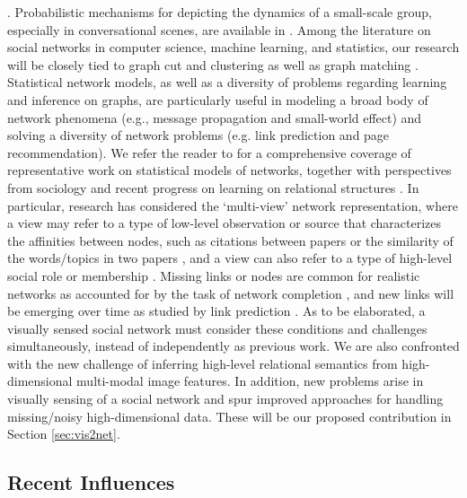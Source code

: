 . Probabilistic mechanisms for depicting the dynamics of a small-scale group, especially in conversational scenes, are available in \cite{Basu:meeting,Dong,Brand:CHMM,Choudhury:MHMM,Pan:influence}. Among the literature on social networks in computer science, machine learning, and statistics, our research will be closely tied to graph cut and clustering \cite{Ng:spectral,Boykov:segmentation,Filippone:clustering,Xu:clustering} as well as graph matching \cite{West:Graph,Caetano:graph}. Statistical network models, as well as a diversity of problems regarding learning and inference on graphs, are particularly useful in modeling a broad body of network phenomena (e.g., message propagation and small-world effect) and solving a diversity of network problems (e.g. link prediction and page recommendation). We refer the reader to \cite{Goldenberg,Kolacyzk} for a comprehensive coverage of representative work on statistical models of networks, together with perspectives from sociology \cite{Snijders} and recent progress on learning on relational structures \cite{Rossi}. In particular, research has considered the `multi-view' network representation, where a view may refer to a type of low-level observation or source that characterizes the affinities between nodes, such as citations between papers or the similarity of the words/topics in two papers \cite{ChangB09,WangMM05}, and a view can also refer to a type of high-level social role or membership \cite{AiroldiBFX08,Kim12}. Missing links or nodes are common for realistic networks as accounted for by the task of network completion \cite{Clauset,Guimera,HannekeX09,KimL11}, and new links will be emerging over time as studied by link prediction \cite{Goldberg,Liben-Nowell,TaskarWAK03}. As to be elaborated, a visually sensed social network must consider these conditions and challenges simultaneously, instead of independently as previous work. We are also confronted with the new challenge of inferring high-level relational semantics from high-dimensional multi-modal image features. In addition, new problems arise in visually sensing of a social network and spur improved approaches for handling missing/noisy high-dimensional data. These will be our proposed contribution in Section \ref{sec:vis2net}.



\subsection{Recent Influences}

